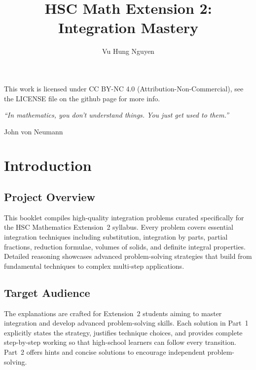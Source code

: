 \documentclass[12pt]{article}
\author{Vu Hung Nguyen}
\title{HSC Math Extension 2: Integration Mastery}
\date{}
\begin{document}


\newpage


\begingroup\small\noindent This work is licensed under CC BY-NC 4.0 (Attribution-Non-Commercial), see the LICENSE file on the github page for more info.\par\endgroup

\newpage
\thispagestyle{empty}
\vspace*{\fill}
\begin{center}
\itshape
``In mathematics, you don't understand things. You just get used to them.''

\vspace{1em}
\normalfont John von Neumann
\end{center}
\vspace*{\fill}

\newpage
\tableofcontents
\newpage

\section{Introduction}

\subsection{Project Overview}
This booklet compiles high-quality integration problems curated specifically for the HSC Mathematics Extension~2 syllabus. Every problem covers essential integration techniques including substitution, integration by parts, partial fractions, reduction formulae, volumes of solids, and definite integral properties. Detailed reasoning showcases advanced problem-solving strategies that build from fundamental techniques to complex multi-step applications.

\subsection{Target Audience}
The explanations are crafted for Extension~2 students aiming to master integration and develop advanced problem-solving skills. Each solution in Part~1 explicitly states the strategy, justifies technique choices, and provides complete step-by-step working so that high-school learners can follow every transition. Part~2 offers hints and concise solutions to encourage independent problem-solving.
\end{document}
